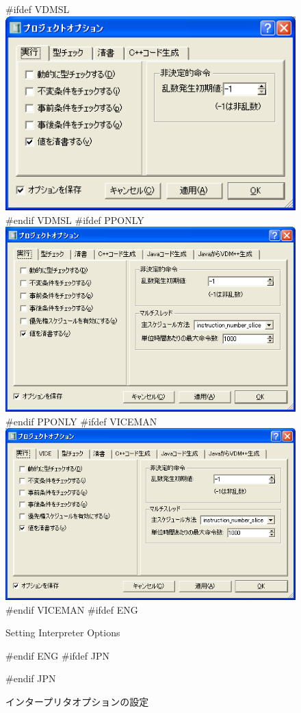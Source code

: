 \documentclass[\pformat,12pt]{article}
\begin{document}
\begin{figure}[tbh]
\begin{center}
#ifdef VDMSL
\includegraphics[width=12.5cm]{interpreterOptions-sl.png}
#endif VDMSL
#ifdef PPONLY
\includegraphics[width=12.5cm]{interpreterOptions-pp.png}
#endif PPONLY
#ifdef VICEMAN
\includegraphics[width=12.5cm]{interpreterOptions-vice.png}
#endif VICEMAN
#ifdef ENG
\caption{Setting Interpreter Options}
#endif ENG
#ifdef JPN
\caption{インタープリタオプションの設定}
#endif JPN
\label{fig:interoptions}
\end{center}
\end{figure}
\end{document}

